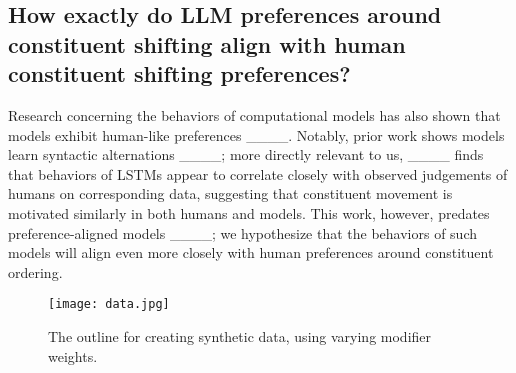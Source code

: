 \subsection{How exactly do LLM preferences around constituent shifting align with human constituent shifting preferences?}

Research concerning the behaviors of computational models has also shown that models exhibit human-like preferences ____.
Notably, prior work shows models learn syntactic alternations ____; more directly relevant to us, ____ finds that behaviors of LSTMs appear to correlate closely with observed judgements of humans on corresponding data, suggesting that constituent movement is motivated similarly in both humans and models. This work, however, predates preference-aligned models ____; we hypothesize that the behaviors of such models will align even more closely with human preferences around constituent ordering.

\begin{figure*}
    \centering
    \texttt{[image: data.jpg]}
    \caption{The outline for creating synthetic data, using varying modifier weights.}
    \label{fig:DFig}
\end{figure*}